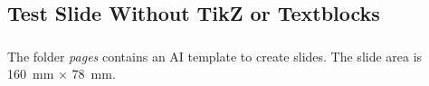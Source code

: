 \documentclass[numberofslides]{AMSBeamer}
\begin{document}
%
%

\subsection{Test Slide Without TikZ or Textblocks}

\begin{frame}[label=slidelabel]
	\frametitle{\insertsubsectionhead}%


	\hfil
	The folder \emph{pages} contains an AI template to create slides. The slide area is \SI{160}{mm} $\times$ \SI{78}{mm}.\newline


\end{frame}

%
%
\end{document}
